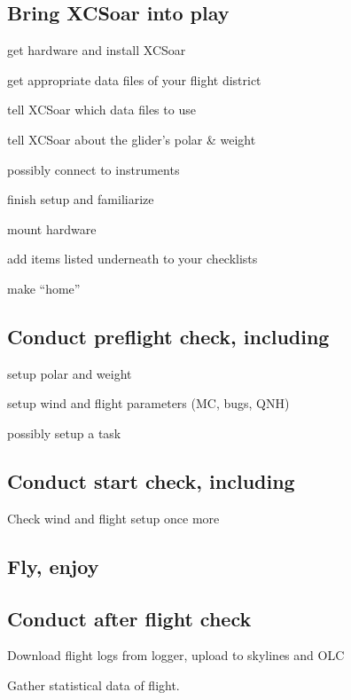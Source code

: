 \documentclass[english,a4paper,12pt]{refrep}
\begin{document}
\subsection{\textcolor{flashblue}{Bring XCSoar into play}}
\begin{compactitem}
\item get hardware and install XCSoar
\item get appropriate data files of your flight district
\item tell XCSoar which data files to use
\item tell XCSoar about the glider's polar \& weight
\item possibly connect to instruments
\item finish setup and familiarize
\item mount hardware
\item add items listed underneath to your checklists
\item make ``home''
\end{compactitem}

\subsection*{\textcolor{flashblue}{Conduct preflight check, including}}
\begin{compactitem}
\item setup polar and weight
\item setup wind and flight parameters (MC, bugs, QNH)
\item possibly setup a task
\end{compactitem}

\subsection*{\textcolor{flashblue}{Conduct start check, including}}
\begin{compactitem}
\item Check wind and flight setup once more
\end{compactitem}

\subsection*{\textcolor{flashblue}{Fly, enjoy}}

\subsection*{\textcolor{flashblue}{Conduct after flight check}}
\begin{compactitem}
\item Download flight logs from logger, upload to skylines and OLC
\item Gather statistical data of flight.
\end{compactitem}
\end{document}
